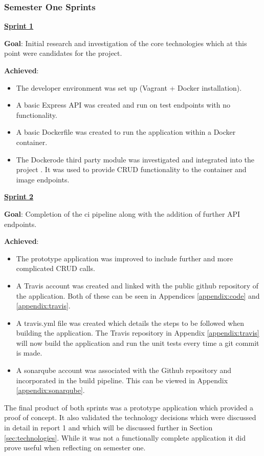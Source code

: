 \subsubsection{Semester One Sprints}
\textbf{\underline{Sprint 1}}

\textbf{Goal}: Initial research and investigation of the core technologies which at this point were candidates for the project.

\textbf{Achieved}:
\begin{itemize}
	\item The developer environment was set up (Vagrant + Docker installation).
	\item A basic Express \gls{API} was created and run on test endpoints with no functionality.
	\item A basic Dockerfile was created to run the application within a Docker container.
	\item The Dockerode third party module was investigated and integrated into the project \citep{Dockerode2017}. It was used to provide \gls{CRUD} functionality to the container and image endpoints.
\end{itemize} 
	
\textbf{\underline{Sprint 2}}

\textbf{Goal}: Completion of the \gls{ci} pipeline along with the addition of further \gls{API} endpoints.

\textbf{Achieved}:
\begin{itemize}
	\item The prototype application was improved to include further and more complicated \gls{CRUD} calls.
	\item A \gls{Travis} account was created and linked with the public \gls{github} repository of the application. Both of these can be seen in Appendices \ref{appendix:code} and \ref{appendix:travis}.
	\item A travis.yml file was created which details the steps to be followed when building the application. The Travis repository in Appendix \ref{appendix:travis} will now build the application and run the unit tests every time a \gls{git} commit is made.
	\item A \gls{sonarqube} account was associated with the Github repository and incorporated in the build pipeline. This can be viewed in Appendix \ref{appendix:sonarqube}.
\end{itemize}
	
The final product of both \glspl{sprint} was a prototype application which provided a proof of concept. It also validated the technology decisions which were discussed in detail in report 1 and which will be discussed further in Section \ref{sec:technologies}. While it was not a functionally complete application it did prove useful when reflecting on semester one.
	
